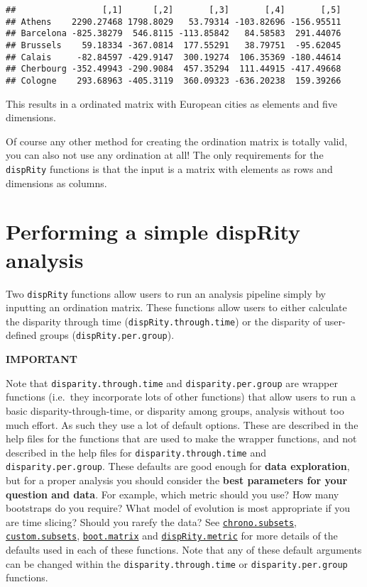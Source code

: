 \documentclass[
]{book}
\begin{document}
\begin{verbatim}
##                 [,1]      [,2]       [,3]       [,4]       [,5]
## Athens    2290.27468 1798.8029   53.79314 -103.82696 -156.95511
## Barcelona -825.38279  546.8115 -113.85842   84.58583  291.44076
## Brussels    59.18334 -367.0814  177.55291   38.79751  -95.62045
## Calais     -82.84597 -429.9147  300.19274  106.35369 -180.44614
## Cherbourg -352.49943 -290.9084  457.35294  111.44915 -417.49668
## Cologne    293.68963 -405.3119  360.09323 -636.20238  159.39266
\end{verbatim}

This results in a ordinated matrix with European cities as elements and five dimensions.

Of course any other method for creating the ordination matrix is totally valid, you can also not use any ordination at all!
The only requirements for the \texttt{dispRity} functions is that the input is a matrix with elements as rows and dimensions as columns.

\hypertarget{simpleanalysis}{%
\section{Performing a simple dispRity analysis}\label{simpleanalysis}}

Two \texttt{dispRity} functions allow users to run an analysis pipeline simply by inputting an ordination matrix.
These functions allow users to either calculate the disparity through time (\texttt{dispRity.through.time}) or the disparity of user-defined groups (\texttt{dispRity.per.group}).

\textbf{IMPORTANT}

Note that \texttt{disparity.through.time} and \texttt{disparity.per.group} are wrapper functions (i.e.~they incorporate lots of other functions) that allow users to run a basic disparity-through-time, or disparity among groups, analysis without too much effort.
As such they use a lot of default options.
These are described in the help files for the functions that are used to make the wrapper functions, and not described in the help files for \texttt{disparity.through.time} and \texttt{disparity.per.group}.
These defaults are good enough for \textbf{data exploration}, but for a proper analysis you should consider the \textbf{best parameters for your question and data}.
For example, which metric should you use?
How many bootstraps do you require?
What model of evolution is most appropriate if you are time slicing?
Should you rarefy the data?
See \protect\hyperlink{time-slicing}{\texttt{chrono.subsets}}, \protect\hyperlink{customised-subsets}{\texttt{custom.subsets}}, \protect\hyperlink{bootstraps-and-rarefactions}{\texttt{boot.matrix}} and \protect\hyperlink{disparity-metrics}{\texttt{dispRity.metric}} for more details of the defaults used in each of these functions.
Note that any of these default arguments can be changed within the \texttt{disparity.through.time} or \texttt{disparity.per.group} functions.
\end{document}
